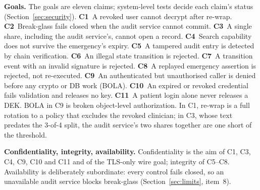 \textbf{Goals.} The goals are eleven claims; system-level tests decide each
claim's status (Section~\ref{sec:security}). %
\textbf{C1}~A revoked user cannot decrypt after re-wrap. %
\textbf{C2}~Break-glass fails closed when the audit service cannot commit. %
\textbf{C3}~A single share, including the audit service's, cannot open a record. %
\textbf{C4}~Search capability does not survive the emergency's expiry. %
\textbf{C5}~A tampered audit entry is detected by chain verification. %
\textbf{C6}~An illegal state transition is rejected. %
\textbf{C7}~A transition event with an invalid signature is rejected. %
\textbf{C8}~A replayed emergency assertion is rejected, not re-executed. %
\textbf{C9}~An authenticated but unauthorised caller is denied before any
crypto or DB work (BOLA). %
\textbf{C10}~An expired or revoked credential fails validation and releases no
key. %
\textbf{C11}~A patient login alone never releases a DEK. %
BOLA in C9 is broken object-level authorization. In C1, re-wrap is a full rotation to a policy that excludes the revoked
clinician; in C3, whose text predates the 3-of-4 split, the audit service's two
shares together are one short of the threshold. %

\textbf{Confidentiality, integrity, availability.} Confidentiality is the aim
of C1, C3, C4, C9, C10 and C11 and of the TLS-only wire goal; integrity of
C5--C8. Availability is deliberately subordinate: every control fails
closed, so an unavailable audit service blocks break-glass
(Section~\ref{sec:limits}, item~8). %
